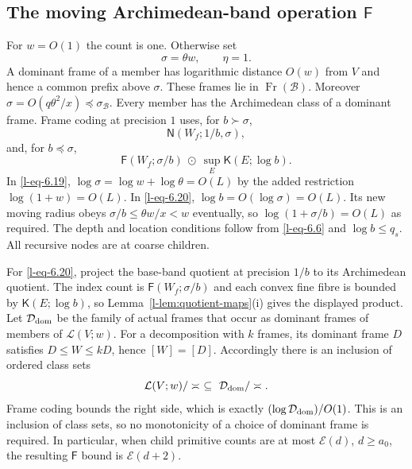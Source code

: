 \documentclass[11pt]{article}
\theoremstyle{definition}
\theoremstyle{remark}
\newcommand{\arch}{\mathrel{\asymp}}
\newcommand{\od}{\mathbin{\odot}}
\newcommand{\EE}{\mathcal E}
\newcommand{\Fr}{\operatorname{Fr}}
\newcommand{\NN}{\mathsf N}
\newcommand{\KK}{\mathsf K}
\newcommand{\FF}{\mathsf F}
\newcommand{\calB}{\mathcal B}
\newcommand{\calL}{\mathcal L}
\numberwithin{equation}{section}
\begin{document}
\subsection{The moving Archimedean-band operation \texorpdfstring{$\FF$}{F}}\label{l-sec:F}

For $w=O(1)$ the count is one.
Otherwise set
\begin{equation}
 \sigma=\theta w,\qquad \eta=1.
 \label{l-eq-6.18}
\end{equation}
A dominant frame of a member has logarithmic distance $O(w)$
from $V$ and hence a common prefix above $\sigma$.
These frames lie in $\Fr(\calB)$.
Moreover $\sigma=O(q\theta^2/x)\preceq\sigma_{\calB}$.
Every member has the Archimedean class of a dominant frame.
Frame coding at precision $1$ uses, for $b\succ\sigma$,
\begin{equation}
 \NN(W_f;1/b,\sigma),
 \label{l-eq-6.19}
\end{equation}
and, for $b\preceq\sigma$,
\begin{equation}
 \FF(W_f;\sigma/b)\ \od\ \sup_E\KK(E;\log b).
 \label{l-eq-6.20}
\end{equation}
In \eqref{l-eq-6.19}, $\log\sigma=\log w+\log\theta=O(L)$
by the added restriction $\log(1+w)=O(L)$.
In \eqref{l-eq-6.20}, $\log b=O(\log\sigma)=O(L)$.
Its new moving radius obeys $\sigma/b\le\theta w/x<w$ eventually,
so $\log(1+\sigma/b)=O(L)$ as required.
The depth and location conditions follow from \eqref{l-eq-6.6} and
$\log b\le q_s$.  All recursive nodes are at coarse children.




For \eqref{l-eq-6.20}, project the base-band quotient at precision
$1/b$ to its Archimedean quotient.  The index count is
$\FF(W_f;\sigma/b)$ and each convex fine fibre is bounded by
$\KK(E;\log b)$, so Lemma~\ref{l-lem:quotient-maps}(i)
gives the displayed product.  Let $\mathcal D_{\rm dom}$ be
the family of actual frames that occur as dominant frames of
members of $\calL(V;w)$.  For a decomposition with $k$ frames,
its dominant frame $D$ satisfies $D\le W\le kD$, hence
$[W]=[D]$.  Accordingly there is an inclusion of ordered class
sets
\[
 \calL(V;w)/\arch\ \subseteq\ \mathcal D_{\rm dom}/\arch.
\]
Frame coding bounds the right side, which is exactly
$(\log\mathcal D_{\rm dom})/O(1)$.  This is an inclusion of
class sets, so no monotonicity of a choice of dominant frame is
required.  In particular, when child primitive counts are at most
$\EE(d)$, $d\ge a_0$, the resulting $\FF$ bound is
$\EE(d+2)$.
\end{document}
